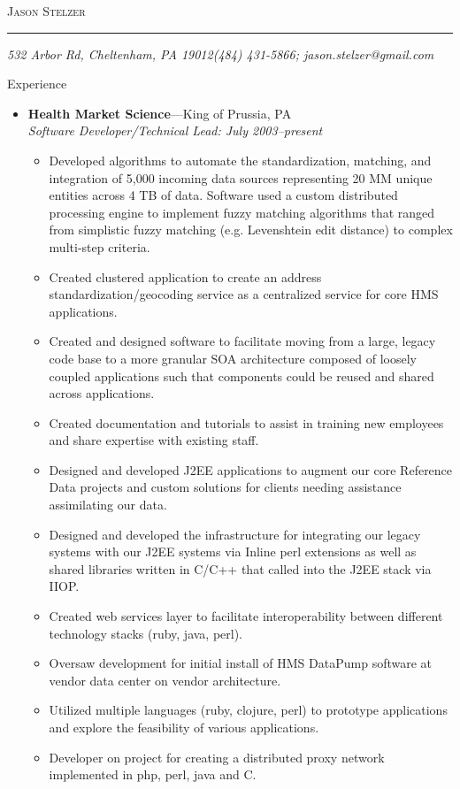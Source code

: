 \documentclass[11pt,oneside]{article}
\makeatletter
\newcommand{\name}{Jason Stelzer}
\newcommand{\addr}{532 Arbor Rd, Cheltenham, PA 19012}
\newcommand{\phone}{(484) 431-5866}
\newcommand{\email}{jason.stelzer@gmail.com}
\newcommand{\bigname}[1]{
	\begin{center}\fontfamily{phv}\selectfont\Huge\scshape#1\end{center}
}
\newenvironment{ressection}[1]{
	\vspace{4pt}
	{\fontfamily{phv}\selectfont\Large#1}
	\begin{itemize}
	\vspace{3pt}
}{
	\end{itemize}
}
\newcommand{\ressubitem}[1]{
	\vspace{-1pt}
	\item \begin{flushleft} #1 \end{flushleft}
}
\newcommand{\resbigitem}[3]{
	\vspace{-5pt}
	\item
	\textbf{#1}---#2 \\
	\textit{#3}
}
\newenvironment{ressubsec}[3]{
	\resbigitem{#1}{#2}{#3}
	\vspace{-2pt}
	\begin{itemize}
}{
	\end{itemize}
}
\makeatother
\begin{document}
 \selectfont

\bigname{\name}

\vspace{-8pt} \rule{\textwidth}{1pt}

\vspace{-1pt} {\small\itshape \addr \hfill \phone; \email}

\vspace{8 pt}




\begin{ressection}{Experience}
	\begin{ressubsec}{Health Market Science}{King of Prussia, PA}{Software Developer/Technical Lead: July 2003--present}
		\ressubitem{Developed algorithms to automate the standardization, matching, and integration of 5,000 incoming data sources representing 20 MM unique entities across 4 TB of data.  Software used a custom distributed processing engine to implement fuzzy matching algorithms that ranged from simplistic fuzzy matching (e.g. Levenshtein edit distance) to complex multi-step criteria. }
		\ressubitem{Created clustered application to create an address standardization/geocoding service as a centralized service for core HMS applications.}
		\ressubitem{Created and designed software to facilitate moving from a large, legacy code base to a more granular SOA architecture composed of loosely coupled applications such that components could be reused and shared across applications.}
		\ressubitem{Created documentation and tutorials to assist in training new employees and share expertise with existing staff.}
	    \ressubitem{Designed and developed J2EE applications to augment our core Reference Data projects and custom solutions for clients needing assistance assimilating our data.}
	    \ressubitem{Designed and developed the infrastructure for integrating our legacy systems with our J2EE systems via Inline perl extensions as well as shared libraries written in C/C++ that called into the J2EE stack via IIOP.}
        \ressubitem{Created web services layer to facilitate interoperability between different technology stacks (ruby, java, perl).}
	    \ressubitem{Oversaw development for initial install of HMS DataPump software at vendor data center on vendor architecture.}
	    \ressubitem{Utilized multiple languages (ruby, clojure, perl) to prototype applications and explore the feasibility of various applications.}
	    \ressubitem{Developer on project for creating a distributed proxy network implemented in php, perl, java and C.}

\end{ressubsec}
\end{ressection}
\end{document}
